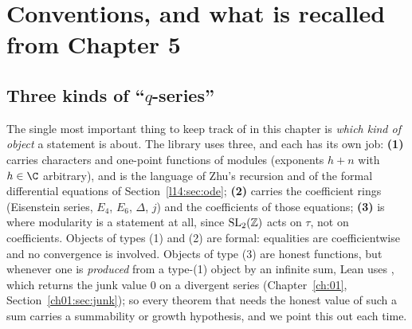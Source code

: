 \section{Conventions, and what is recalled from Chapter 5}\label{l14:sec:recall}

\subsection{Three kinds of ``$q$-series''}\label{l14:sec:threekinds}

The single most important thing to keep track of in this chapter is \emph{which kind of object} a statement is about. The
library uses three, and each has its own job: \textbf{(1)} carries characters and one-point functions of modules (exponents
$h+n$ with $h\in\C$ arbitrary), and is the language of Zhu's recursion and of the formal differential equations of
Section~\ref{l14:sec:ode}; \textbf{(2)} carries the coefficient rings (Eisenstein series, $E_4$, $E_6$, $\Delta$, $j$) and the
coefficients of those equations; \textbf{(3)} is where modularity is a statement at all, since $\mathrm{SL}_2(\mathbb{Z})$ acts on $\tau$, not on
coefficients. Objects of types (1) and (2) are formal: equalities are coefficientwise and no convergence is involved. Objects
of type (3) are honest functions, but whenever one is \emph{produced} from a type-(1) object by an infinite sum, Lean uses
, which returns the junk value $0$ on a divergent series (Chapter~\ref{ch:01}, Section~\ref{ch01:sec:junk}); so every
theorem that needs the honest value of such a sum carries a summability or growth hypothesis, and we point this out each
time.
